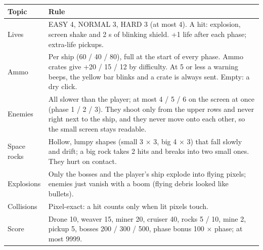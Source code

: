 \documentclass[11pt,a4paper]{article}
\begin{document}
\par\noindent\begin{minipage}{\linewidth}\centering\small
\begin{tabular}{|>{\raggedright\arraybackslash}p{2.91cm}|>{\raggedright\arraybackslash}p{13.59cm}|}
\hline\rowcolor{accent}\textbf{\color{white}Topic} & \textbf{\color{white}Rule}\\\hline
Lives & EASY 4, NORMAL 3, HARD 3 (at most 4). A hit: explosion, screen shake and 2 s of blinking shield. +1 life after each phase; extra-life pickups.\\\hline
\rowcolor{rowshade}Ammo & Per ship (60 / 40 / 80), full at the start of every phase. Ammo crates give +20 / 15 / 12 by difficulty. At 5 or less a warning beeps, the yellow bar blinks and a crate is always sent. Empty: a dry click.\\\hline
Enemies & All slower than the player; at most 4 / 5 / 6 on the screen at once (phase 1 / 2 / 3). They shoot only from the upper rows and never right next to the ship, and they never move onto each other, so the small screen stays readable.\\\hline
\rowcolor{rowshade}Space rocks & Hollow, lumpy shapes (small 3 × 3, big 4 × 3) that fall slowly and drift; a big rock takes 2 hits and breaks into two small ones. They hurt on contact.\\\hline
Explosions & Only the bosses and the player's ship explode into flying pixels; enemies just vanish with a boom (flying debris looked like bullets).\\\hline
\rowcolor{rowshade}Collisions & Pixel-exact: a hit counts only when lit pixels touch.\\\hline
Score & Drone 10, weaver 15, miner 20, cruiser 40, rocks 5 / 10, mine 2, pickup 5, bosses 200 / 300 / 500, phase bonus 100 × phase; at most 9999.\\\hline
\end{tabular}
\end{minipage}\par\medskip
\end{document}
